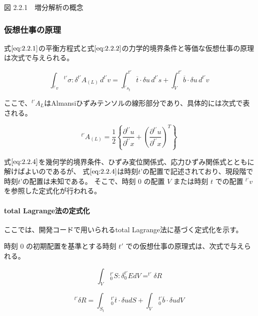 \documentclass[a4paper,pandoc,ja=standard]{bxjsarticle}
\let\oldparagraph\paragraph
\renewcommand{\paragraph}[1]{\oldparagraph{#1}\mbox{}}
\begin{document}
図 2.2.1　増分解析の概念

\hypertarget{ux4eeeux60f3ux4ed5ux4e8bux306eux539fux7406-1}{%
\subsubsection{仮想仕事の原理}\label{ux4eeeux60f3ux4ed5ux4e8bux306eux539fux7406-1}}

式\(\eqref{eq:2.2.1}\)の平衡方程式と式\(\eqref{eq:2.2.2}\)の力学的境界条件と等価な仮想仕事の原理は次式で与えられる。

\begin{equation}
\int_{^{t'}v}{^{t'} \sigma} : \delta^{t'} A_{(L)} \, d^{t'}v =
\int_{^{t'} s_t}^{t'}
\overline{t}
\cdot \delta u \, d^{t'}s +
\int_{V}^{t'}
\overline{b} \cdot \delta u \, d^{t'}v
\label{eq:2.2.4}
\end{equation}

ここで、\(^{t'} A_L\)はAlmansiひずみテンソルの線形部分であり、具体的には次式で表される。

\begin{equation}
^{t'} A_{(L)} = \frac{1}{2}
\left\lbrace \frac{\partial ^{t'} u}{\partial ^{t'} x} + \left( \frac{ \partial ^{t'} u}{\partial ^{t'} x} \right) ^T \right\rbrace
\label{eq:2.2.5}
\end{equation}

式\(\eqref{eq:2.2.4}\)を幾何学的境界条件、ひずみ変位関係式、応力ひずみ関係式とともに解けばよいのであるが、
式\(\eqref{eq:2.2.4}\)は時刻\(t’\)の配置で記述されており、現段階で時刻\(t’\)の配置は未知である。
そこで、時刻 \(0\) の配置 \(V\) または時刻 \(t\) での配置 \(^{t'} v\) を参照した定式化が行われる。

\hypertarget{total-lagrangeux6cd5ux306eux5b9aux5f0fux5316}{%
\paragraph{total Lagrange法の定式化}\label{total-lagrangeux6cd5ux306eux5b9aux5f0fux5316}}

ここでは、開発コードで用いられるtotal Lagrange法に基づく定式化を示す。

時刻 \(0\) の初期配置を基準とする時刻 \(t'\) での仮想仕事の原理式は、次式で与えられる。

\begin{equation}
\int_{V}\,^{t'}_{0} S:\delta_0^{t'}
E dV=^{t'}\delta R
\label{eq:2.2.6}
\end{equation}

\begin{equation}
^{t'} \delta R =
\int_{S_t} \,
^{t'}_0 \overline{t} \cdot \delta u dS+
\int_{V} \,
^{t'}_{0} \overline{b} \cdot \delta u dV
\label{eq:2.2.7}
\end{equation}
\end{document}
